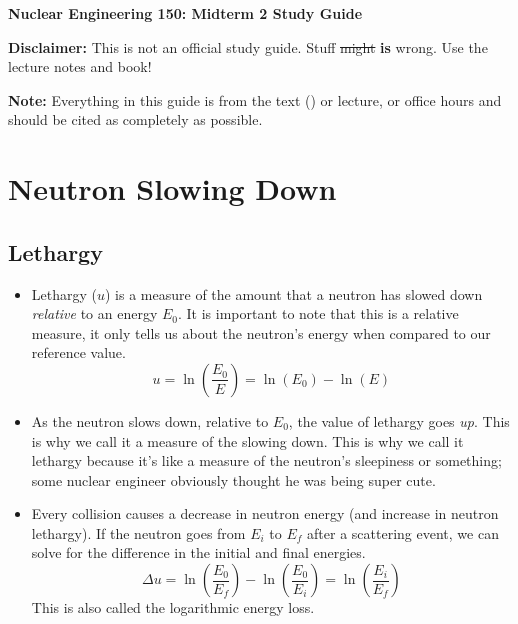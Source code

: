 \documentclass[letter]{article}
\begin{document}
\textbf{\Large{Nuclear Engineering 150: Midterm 2 Study Guide}} \\
\vspace{12pt}

\textbf{Disclaimer:} This is not an official study guide. Stuff \sout{might}
\textbf{is} wrong. Use the lecture notes and book!
\vspace{10pt}

\textbf{Note:} Everything in this guide is from the text () or
lecture, or office hours and should be cited as completely as
possible.

\tableofcontents

\section{Neutron Slowing Down}

\subsection{Lethargy}

\begin{itemize}
\item Lethargy ($u$) is a measure of the amount that a neutron has slowed
  down \textit{relative} to an energy $E_0$. It is important to note
  that this is a relative measure, it only tells us about the
  neutron's energy when compared to our reference value.\cite[Lec. 9]{lecture}
  \begin{equation*}
    u = \ln\left(\frac{E_0}{E}\right)=\ln(E_0)-\ln(E)
  \end{equation*}
\item As the neutron slows down, relative to $E_0$, the value of
  lethargy goes \textit{up}. This is why we call it a measure of the
  slowing down. This is why we call it lethargy because it's like a
  measure of the neutron's sleepiness or something; some nuclear
  engineer obviously thought he was being super cute.\cite[Lec. 9]{lecture}
\item Every collision causes a decrease in neutron energy (and
  increase in neutron lethargy). If the neutron goes from $E_i$ to
  $E_f$ after a scattering event, we can solve for the difference in
  the initial and final energies.
  \begin{equation*}
    \Delta{}u=\ln\left(\frac{E_0}{E_f}\right)-\ln\left(\frac{E_0}{E_i}\right)=\ln\left(\frac{E_i}{E_f}\right)
  \end{equation*}
This is also called the logarithmic energy loss.\cite[Lec.9]{lecture}
\end{itemize}
\end{document}
